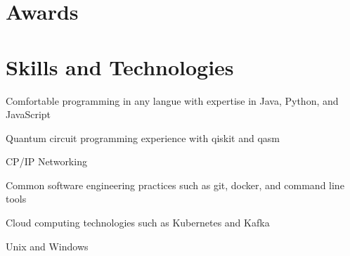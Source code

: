 \documentclass[11pt,a4paper,sans]{moderncv}        %
\begin{document}
\section{Awards}

\section{Skills and Technologies}
Comfortable programming in any langue with expertise in Java, Python, and JavaScript

Quantum circuit programming experience with qiskit and qasm

CP/IP Networking

Common software engineering practices such as git, docker, and command line tools

Cloud computing technologies such as Kubernetes and Kafka 

Unix and Windows
\end{document}
